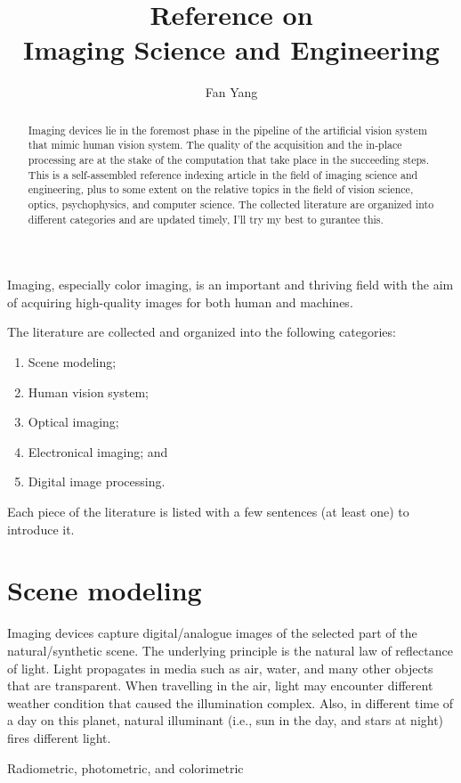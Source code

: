 \documentclass[a4paper]{article}
\title{\LARGE \bf
Reference on\\Imaging Science and Engineering
}
\author{Fan Yang}
\begin{document}
\maketitle

\begin{abstract}
Imaging devices lie in the foremost phase in the pipeline of the artificial vision system that mimic human vision system. 
The quality of the acquisition and the in-place processing are at the stake of the computation that take place in the succeeding steps. 
This is a self-assembled reference indexing article in the field of imaging science and engineering, plus to some extent on the relative topics in the field of vision science, optics, psychophysics, and computer science. 
The collected literature are organized into different categories and are updated timely, I'll try my best to gurantee this. 
\end{abstract}

Imaging, especially color imaging, is an important and thriving field with the aim of acquiring high-quality images for both human and machines.

The literature are collected and organized into the following categories:
\begin{enumerate}
\item Scene modeling;
\item Human vision system;
\item Optical imaging;
\item Electronical imaging; and
\item Digital image processing.
\end{enumerate}
Each piece of the literature is listed with a few sentences (at least one) to introduce it. 

\section{Scene modeling}

Imaging devices capture digital/analogue images of the selected part of the natural/synthetic scene. 
The underlying principle is the natural law of reflectance of light. 
Light propagates in media such as air, water, and many other objects that are transparent. 
When travelling in the air, light may encounter different weather condition that caused the illumination complex. 
Also, in different time of a day on this planet, natural illuminant (i.e., sun in the day, and stars at night) fires different light. 

Radiometric, photometric, and colorimetric
\end{document}
